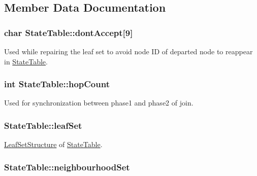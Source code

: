 \subsection{Member Data Documentation}
\hypertarget{structStateTable_a9c09d0935258b0ac3f5675ccdc66dded}{
\subsubsection[{dont\-Accept}]{\setlength{\rightskip}{0pt plus 5cm}char State\-Table\-::dont\-Accept\mbox{[}9\mbox{]}}}\label{structStateTable_a9c09d0935258b0ac3f5675ccdc66dded}
Used while repairing the leaf set to avoid node I\-D of departed node to reappear in \hyperlink{structStateTable}{State\-Table}. \hypertarget{structStateTable_ae516afd0b69c8a2b813729d60fec358d}{
\subsubsection[{hop\-Count}]{\setlength{\rightskip}{0pt plus 5cm}int State\-Table\-::hop\-Count}}\label{structStateTable_ae516afd0b69c8a2b813729d60fec358d}
Used for synchronization between phase1 and phase2 of join. \hypertarget{structStateTable_a1fc9c824d5a46581e41be343ed413a33}{
\subsubsection[{leaf\-Set}]{ State\-Table\-::leaf\-Set}}\label{structStateTable_a1fc9c824d5a46581e41be343ed413a33}
\hyperlink{structLeafSetStructure}{Leaf\-Set\-Structure} of \hyperlink{structStateTable}{State\-Table}. \hypertarget{structStateTable_a85564c6deec324c3db3263ca08263f63}{
\subsubsection[{neighbourhood\-Set}]{ State\-Table\-::neighbourhood\-Set}}\label{structStateTable_a85564c6deec324c3db3263ca08263f63}
